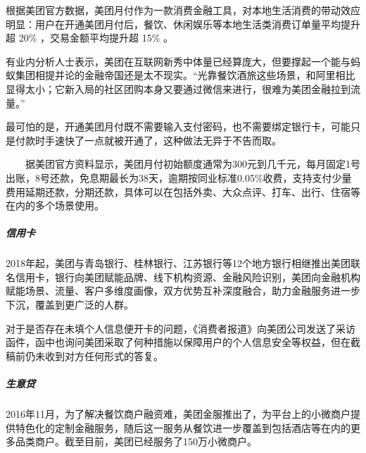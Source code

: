 \documentclass[letterpaper,11pt,english]{sphinxmanual}
\begin{document}
根据美团官方数据，美团月付作为一款消费金融工具，对本地生活消费的带动效应明显：用户在开通美团月付后，餐饮、休闲娱乐等本地生活类消费订单量平均提升超
20\% ，交易金额平均提升超 15\%
。%
\begin{footnote}[920]\sphinxAtStartFootnote
{}
%
\end{footnote}

有业内分析人士表示，美团在互联网新秀中体量已经算庞大，但要撑起一个能与蚂蚁集团相提并论的金融帝国还是太不现实。“光靠餐饮酒旅这些场景，和阿里相比显得太小；它新入局的社区团购本身又要通过微信来进行，很难为美团金融拉到流量。”%
\begin{footnote}[921]\sphinxAtStartFootnote
{}
%
\end{footnote}

最可怕的是，开通美团月付既不需要输入支付密码，也不需要绑定银行卡，可能只是付款时手速快了一点就被开通了，这种做法无异于不告而取。

　　据美团官方资料显示，美团月付初始额度通常为300元到几千元，每月固定1号出账，8号还款，免息期最长为38天，逾期按同业标准0.05\%收费，支持支付少量费用延期还款，分期还款，具体可以在包括外卖、大众点评、打车、出行、住宿等在内的多个场景使用。%
\begin{footnote}[922]\sphinxAtStartFootnote
{}
%
\end{footnote}


\subparagraph{信用卡}
\label{\detokenize{chapter_company/meituan:id14}}
2018年起，美团与青岛银行、桂林银行、江苏银行等12个地方银行相继推出美团联名信用卡，银行向美团赋能品牌、线下机构资源、金融风险识别，美团向金融机构赋能场景、流量、客户多维度画像，双方优势互补深度融合，助力金融服务进一步下沉，覆盖到更广泛的人群。

对于是否存在未填个人信息便开卡的问题，《消费者报道》向美团公司发送了采访函件，函中也询问美团采取了何种措施以保障用户的个人信息安全等权益，但在截稿前仍未收到对方任何形式的答复。%
\begin{footnote}[923]\sphinxAtStartFootnote
{}
%
\end{footnote}


\subparagraph{生意贷}
\label{\detokenize{chapter_company/meituan:id15}}
2016年11月，为了解决餐饮商户融资难，美团金服推出了，为平台上的小微商户提供特色化的定制金融服务，随后这一服务从餐饮进一步覆盖到包括酒店等在内的更多品类商户。截至目前，美团已经服务了150万小微商户。%
\begin{footnote}[924]\sphinxAtStartFootnote
{}
%
\end{footnote}
\end{document}
